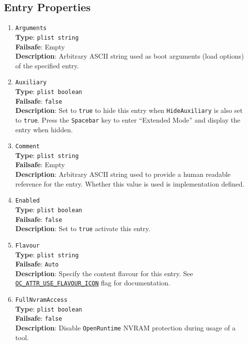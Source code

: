 \documentclass[]{article}
\makeatletter
\renewcommand{\label}[1]{%
\zref@wrapper@immediate{\oldlabel{#1}}}  %
\makeatother
\begin{document}
\subsection{Entry Properties}\label{miscentryprops}

\begin{enumerate}
\item
  \texttt{Arguments}\\
  \textbf{Type}: \texttt{plist\ string}\\
  \textbf{Failsafe}: Empty\\
  \textbf{Description}: Arbitrary ASCII string used as boot arguments (load options)
  of the specified entry.

\item
  \texttt{Auxiliary}\\
  \textbf{Type}: \texttt{plist\ boolean}\\
  \textbf{Failsafe}: \texttt{false}\\
  \textbf{Description}: Set to \texttt{true} to hide this entry
  when \texttt{HideAuxiliary} is also set to \texttt{true}.
  Press the \texttt{Spacebar} key to enter ``Extended Mode'' and display the entry when hidden.

\item
  \texttt{Comment}\\
  \textbf{Type}: \texttt{plist\ string}\\
  \textbf{Failsafe}: Empty\\
  \textbf{Description}: Arbitrary ASCII string used to provide a human readable
  reference for the entry. Whether this value is used is implementation defined.

\item
  \texttt{Enabled}\\
  \textbf{Type}: \texttt{plist\ boolean}\\
  \textbf{Failsafe}: \texttt{false}\\
  \textbf{Description}: Set to \texttt{true} activate this entry.

\item
  \texttt{Flavour}\\
  \textbf{Type}: \texttt{plist\ string}\\
  \textbf{Failsafe}: \texttt{Auto}\\
  \textbf{Description}: Specify the content flavour for this entry.
  See \hyperref[oc-attr-use-flavour-icon]{\texttt{OC\_ATTR\_USE\_FLAVOUR\_ICON}} flag for documentation.

  \item
  \texttt{FullNvramAccess}\\
  \textbf{Type}: \texttt{plist\ boolean}\\
  \textbf{Failsafe}: \texttt{false}\\
  \textbf{Description}: Disable \texttt{OpenRuntime} NVRAM protection during usage of a tool.


\end{enumerate}
\end{document}
